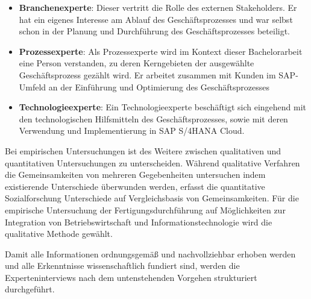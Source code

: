\begin{itemize}
    \item 
    \textbf{Branchenexperte}: Dieser vertritt die Rolle des externen Stakeholders. Er hat ein eigenes Interesse am Ablauf des Geschäftsprozesses und war selbst schon in der Planung und Durchführung des Geschäftsprozesses beteiligt.
    \item
    \textbf{Prozessexperte}: Als Prozessexperte wird im Kontext dieser Bachelorarbeit eine Person verstanden, zu deren Kerngebieten der ausgewählte Geschäftsprozess gezählt wird. Er arbeitet zusammen mit Kunden im SAP-Umfeld an der Einführung und Optimierung des Geschäftsprozesses
    \item
    \textbf{Technologieexperte}:  Ein Technologieexperte beschäftigt sich eingehend mit den technologischen Hilfsmitteln des Geschäftsprozesses, sowie mit deren Verwendung und Implementierung in SAP S/4HANA Cloud.
\end{itemize}

Bei empirischen Untersuchungen ist des Weitere  zwischen qualitativen und quantitativen Untersuchungen zu unterscheiden. Während qualitative Verfahren die Gemeinsamkeiten von mehreren Gegebenheiten untersuchen indem existierende Unterschiede überwunden werden, erfasst die quantitative Sozialforschung Unterschiede auf Vergleichsbasis von Gemeinsamkeiten. Für die empirische Untersuchung der Fertigungsdurchführung auf Möglichkeiten zur Integration von Betriebswirtschaft und Informationstechnologie wird die qualitative Methode gewählt. 

Damit alle Informationen ordnungsgemäß und nachvollziehbar erhoben werden und alle Erkenntnisse wissenschaftlich fundiert sind, werden die Experteninterviews nach dem untenstehenden Vorgehen strukturiert durchgeführt.

